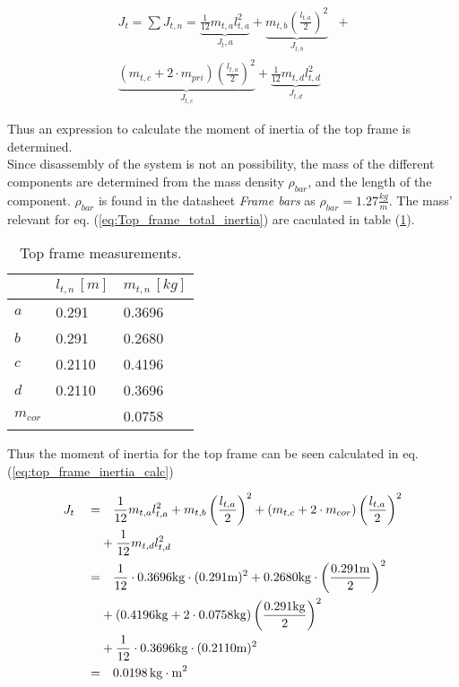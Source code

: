 \documentclass[../../main]{subfiles}
\begin{document}
\begin{equation}
  \label{eq:Top_frame_total_inertia}
\begin{split}
  J_t = \sum J_{t,n} =
  \underbrace{\frac{1}{12}m_{t,a}l_{t,a}^2}_\text{$J_t,a$} +
  \underbrace{m_{t,b}\left(\frac{l_{t,a}}{2}\right)^2}_\text{$J_{t,b}$} &+ \\
  \underbrace{(m_{t,c} + 2\cdot m_{pri})\left(\frac{l_{t,a}}{2}\right)^2}_\text{$J_{t,c}$} +
  \underbrace{\frac{1}{12}m_{t,d}l_{t,d}^2}_\text{$J_{t,d}$}
\end{split}
\end{equation}

Thus an expression to calculate the moment of inertia of the top frame is determined.\\

Since disassembly of the system is not an possibility, the mass of the different components are determined from the mass density $\rho_{bar}$, and the length of the component. $\rho_{bar}$ is found in the datasheet \textit{Frame bars} as $\rho_{bar} = 1.27 \si{\frac{kg}{m}}$. The mass' relevant for eq. (\ref{eq:Top_frame_total_inertia}) are caculated in table (\ref{tab:Top_frame_table}).

\begin{table}[H]
\centering
\begin{tabular}{|l|l|l|}
\hline
  & $l_{t,n} \, \si{[m]}$ & $m_{t,n} \, \si{[kg]}$ \\
\hline
$a$ & 0.291  & 0.3696  \\
\hline
$b$ & 0.291  & 0.2680  \\
\hline
$c$ & 0.2110 & 0.4196  \\
\hline
$d$ & 0.2110 & 0.3696  \\
\hline
$m_{cor}$ & & 0.0758 \\
\hline
\end{tabular}
\caption{Top frame measurements.}
    \label{tab:Top_frame_table}
\end{table}

Thus the moment of inertia for the top frame can be seen calculated in eq. (\ref{eq:top_frame_inertia_calc})

\begin{equation}
  \centering
    \label{eq:top_frame_inertia_calc}
  \begin{split}
      J_t  \quad  =&  \quad \frac{1}{12} m_{t,a}l_{t,a}^2 + m_{t,b}\left(\frac{l_{t,a}}{2}\right)^2 + (m_{t,c} + 2\cdot m_{cor})\left(\frac{l_{t,a}}{2}\right)^2 \\
      &+ \frac{1}{12}m_{t,d}l_{t,d}^2 \\
      =& \quad  \frac{1}{12} \cdot 0.3696 \si{kg}  \cdot (0.291 \si{m})^2 + 0.2680 \si{kg} \cdot \left(\frac{0.291 \si{m}}{2}\right)^2 \\
      &+ (0.4196 \si{kg} + 2\cdot 0.0758 \si{kg})\left(\frac{0.291\si{kg}}{2}\right)^2 \\
      &+ \frac{1}{12} \cdot 0.3696\si{kg} \cdot (0.2110\si{m})^2 \\
      =& \quad 0.0198 \si{\,kg\cdot m^2}
  \end{split}
\end{equation}
\end{document}
